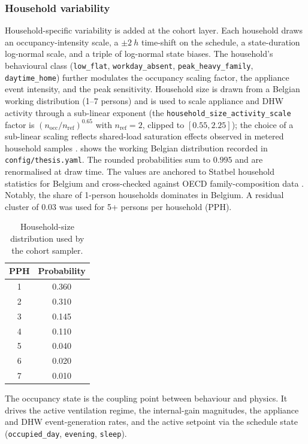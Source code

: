 \subsubsection*{Household variability}
Household-specific variability is added at the cohort layer. Each household draws an occupancy-intensity scale, a $\pm\SI{2}{h}$ time-shift on the schedule, a state-duration log-normal scale, and a triple of log-normal state biases. The household's behavioural class (\texttt{low\_flat}, \texttt{workday\_absent}, \texttt{peak\_heavy\_family}, \texttt{daytime\_home}) further modulates the occupancy scaling factor, the appliance event intensity, and the peak sensitivity. Household size is drawn from a Belgian working distribution (1--7 persons) and is used to scale appliance and DHW activity through a sub-linear exponent (the \texttt{household\_size\_activity\_scale} factor is $(n_{\text{occ}}/n_{\text{ref}})^{0.65}$ with $n_{\text{ref}}=2$, clipped to $[0.55, 2.25]$); the choice of a sub-linear scaling reflects shared-load saturation effects observed in metered household samples \cite{Wilke2013StochasticOccupancy}.  shows the working Belgian distribution recorded in \texttt{config/thesis.yaml}. The rounded probabilities sum to $0.995$ and are renormalised at draw time. The values are anchored to Statbel household statistics for Belgium \cite{Statbel2024Households} and cross-checked against OECD family-composition data \cite{OECDFamilyDatabase}. Notably, the share of 1-person households dominates in Belgium. A residual cluster of 0.03 was used for 5+ persons per household (PPH).

\begin{table}[ht]
  \centering
  \footnotesize
  \caption{Household-size distribution used by the cohort sampler.}
  \label{tab:household_size_dist}
  \begin{tabular}{@{}c c@{}}
    \toprule
    \textbf{PPH} & \textbf{Probability}\\
    \midrule
    1 & 0.360 \\
    2 & 0.310 \\
    3 & 0.145 \\
    4 & 0.110 \\
    5 & 0.040 \\
    6 & 0.020 \\
    7 & 0.010 \\
    \bottomrule
  \end{tabular}
\end{table}

The occupancy state is the coupling point between behaviour and physics. It drives the active ventilation regime, the internal-gain magnitudes, the appliance and DHW event-generation rates, and the active setpoint via the schedule state (\texttt{occupied\_day}, \texttt{evening}, \texttt{sleep}).

